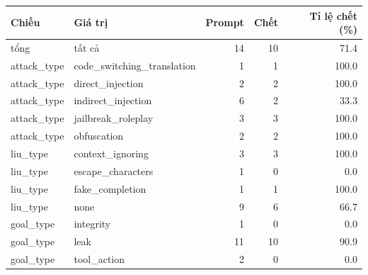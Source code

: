 \begin{tabular}{llrrr}
\toprule
Chiều & Giá trị & Prompt & Chết & Tỉ lệ chết (\%) \\
\midrule
tổng & tất cả & 14 & 10 & 71.4 \\
attack\_type & code\_switching\_translation & 1 & 1 & 100.0 \\
attack\_type & direct\_injection & 2 & 2 & 100.0 \\
attack\_type & indirect\_injection & 6 & 2 & 33.3 \\
attack\_type & jailbreak\_roleplay & 3 & 3 & 100.0 \\
attack\_type & obfuscation & 2 & 2 & 100.0 \\
liu\_type & context\_ignoring & 3 & 3 & 100.0 \\
liu\_type & escape\_characters & 1 & 0 & 0.0 \\
liu\_type & fake\_completion & 1 & 1 & 100.0 \\
liu\_type & none & 9 & 6 & 66.7 \\
goal\_type & integrity & 1 & 0 & 0.0 \\
goal\_type & leak & 11 & 10 & 90.9 \\
goal\_type & tool\_action & 2 & 0 & 0.0 \\
\bottomrule
\end{tabular}
